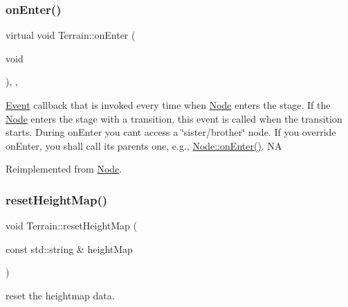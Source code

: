 \mbox{\label{classTerrain_a1d3c0deb9503e340a9818c8cf8c61923}} 
\subsubsection{\texorpdfstring{on\+Enter()}{onEnter()}\hspace{0.1cm}{\footnotesize\ttfamily [2/2]}}
{\footnotesize\ttfamily virtual void Terrain\+::on\+Enter (\begin{DoxyParamCaption}\item[{void}]{ }\end{DoxyParamCaption})\hspace{0.3cm}{\ttfamily [override]}, {\ttfamily [protected]}, {\ttfamily [virtual]}}

\hyperlink{classEvent}{Event} callback that is invoked every time when \hyperlink{classNode}{Node} enters the \textquotesingle{}stage\textquotesingle{}. If the \hyperlink{classNode}{Node} enters the \textquotesingle{}stage\textquotesingle{} with a transition, this event is called when the transition starts. During on\+Enter you can\textquotesingle{}t access a \char`\"{}sister/brother\char`\"{} node. If you override on\+Enter, you shall call its parent\textquotesingle{}s one, e.\+g., \hyperlink{classNode_a7f51764c4afd5018a052b9ef71c03374}{Node\+::on\+Enter()}.  NA 

Reimplemented from \hyperlink{classNode_a7f51764c4afd5018a052b9ef71c03374}{Node}.

\mbox{\label{classTerrain_a9fdf4b0a5b92fc5ac98c69dc41f7efab}} 
\subsubsection{\texorpdfstring{reset\+Height\+Map()}{resetHeightMap()}\hspace{0.1cm}{\footnotesize\ttfamily [1/2]}}
{\footnotesize\ttfamily void Terrain\+::reset\+Height\+Map (\begin{DoxyParamCaption}\item[{const std\+::string \&}]{height\+Map }\end{DoxyParamCaption})}

reset the heightmap data. \mbox{\label{classTerrain_a9fdf4b0a5b92fc5ac98c69dc41f7efab}} 
